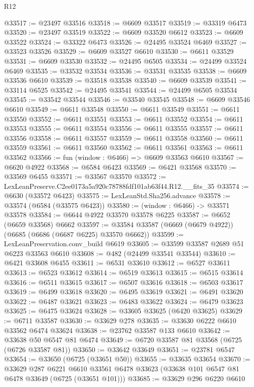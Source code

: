 \begin{lexlean}{R12}
\begin{coremodule}
@33517 := @23497 @33516
@33518 := @6609 @33517
@33519 := @33319 @6473
@33520 := @23497 @33519
@33522 := @6609 @33520 @6612
@33523 := @6609 @33522
@33524 := @33322 @6473
@33526 := @24495 @33524 @6469
@33527 := @33523 @33526
@33529 := @6609 @33527 @6610
@33530 := @6611 @33529
@33531 := @6609 @33530
@33532 := @24495 @6505
@33534 := @24499 @33524 @6469
@33535 := @33532 @33534
@33536 := @33531 @33535
@33538 := @6609 @33536 @6610
@33539 := @33518 @33538
@33540 := @6609 @33539
@33541 := @33114 @6525
@33542 := @24495 @33541
@33544 := @24499 @6505 @33534
@33545 := @33542 @33544
@33546 := @33540 @33545
@33548 := @6609 @33546 @6610
@33549 := @6611 @33548
@33550 := @6611 @33549
@33551 := @6611 @33550
@33552 := @6611 @33551
@33553 := @6611 @33552
@33554 := @6611 @33553
@33555 := @6611 @33554
@33556 := @6611 @33555
@33557 := @6611 @33556
@33558 := @6611 @33557
@33559 := @6611 @33558
@33560 := @6611 @33559
@33561 := @6611 @33560
@33562 := @6611 @33561
@33563 := @6611 @33562
@33566 := fun (window : @6466) => @6609 @33563 @6610
@33567 := @6620 @4922
@33568 := @6584 @6423
@33569 := @6421 @33568
@33570 := @33569 @6455
@33571 := @33567 @33570
@33572 := LexLeanPreserve.C2ee0173a5a920c78788fdf101ab63f44.R12.__fits_35
@33574 := @6630 (@33572 @6423)
@33575 := LexLeanStd.Sha256.advance
@33578 := @33574 (@6584 (@33575 @6423))
@33580 := (window : @6466) -> @33571 @33578
@33584 := @6644 @4922 @33570 @33578 @6225
@33587 := @6652 (@6659 @33568) @6662
@33597 := @33584 @33587 (@6669 (@6679 @4922)) (@6685 (@6686 (@6687 @6225) @33570 @6662))
@33599 := LexLeanPreservation.conv_build @6619
@33605 := @33599 @33587 @2689 @51 @6223 @33563 @6610
@33608 := @482 (@24499 @33541 @33544)
@33610 := @6421 @33608 @6455
@33611 := @6531 @33610
@33612 := @6527 @33611
@33613 := @6523 @33612
@33614 := @6519 @33613
@33615 := @6515 @33614
@33616 := @6511 @33615
@33617 := @6507 @33616
@33618 := @6503 @33617
@33619 := @6499 @33618
@33620 := @6495 @33619
@33621 := @6491 @33620
@33622 := @6487 @33621
@33623 := @6483 @33622
@33624 := @6479 @33623
@33625 := @6475 @33624
@33628 := @33605 @33625 (@6420 @33625)
@33629 := @6711 @33587
@33630 := @33629 @278
@33635 := @33630 @6222 @6610 @33562 @6474 @33624
@33638 := @23762 @33587 @133 @6610
@33642 := @33638 @50 @6547 @81 @6474
@33649 := @6720 @33587 @81 @33568 (@6725 (@6726 @33587 @81))
@33650 := @33642 @33649
@33651 := @23781 @6547
@33654 := @33650 (@6725 (@33651 @50))
@33655 := @33635 @33654
@33670 := @33629
    @287
    @6221
    @6610
    @33561
    @6478
    @33623
    (@33638 @101 @6547 @81 @6478 @33649 (@6725 (@33651 @101)))
@33685 := @33629
    @296
    @6220
    @6610

\end{coremodule}
\end{lexlean}
